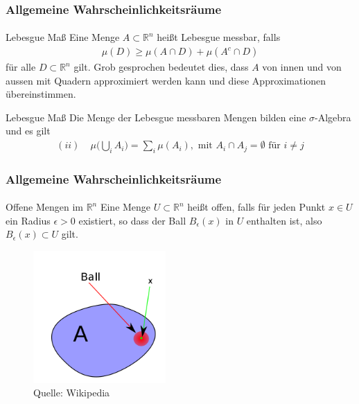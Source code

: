\documentclass{beamer}
\begin{document}
\begin{frame}
    \frametitle{Allgemeine Wahrscheinlichkeitsräume}
\framesubtitle{}

\begin{block}{Lebesgue Maß}
Eine Menge $A \subset \mathbb{R}^n$ heißt Lebesgue messbar, falls
\begin{align*}
\mu(D) \geq \mu(A \cap D) + \mu(A^c \cap D)
\end{align*}
für alle $D \subset  \mathbb{R}^n$ gilt. Grob gesprochen bedeutet dies, dass $A$ von innen und von aussen mit Quadern approximiert werden kann und diese Approximationen übereinstimmen.
\end{block}


\begin{block}{Lebesgue Maß}
Die Menge der  Lebesgue messbaren Mengen bilden eine $\sigma$-Algebra und es gilt 
\begin{align*}
(ii) & \;  \mu \biggl(  \bigcup_i A_i  \biggr) = \sum_i \mu(A_i), \text{ mit } A_i \cap A_j = \emptyset \text{ für } i \neq j
\end{align*}
\end{block}


 \end{frame}




\begin{frame}
    \frametitle{Allgemeine Wahrscheinlichkeitsräume}
\framesubtitle{}

\begin{block}{Offene Mengen im  $\mathbb{R}^n$}
Eine Menge $U \subset  \mathbb{R}^n$ heißt offen, falls für jeden Punkt $x \in U$ ein Radius $\epsilon > 0$ existiert, so dass der Ball $B_\epsilon (x)$ in $U$ enthalten ist, also 
$B_\epsilon (x) \subset U$ gilt.

\end{block}

\begin{figure}[htp]
      \centering
    \includegraphics[width=0.45\textwidth]{img/openset}
      \caption{Quelle: Wikipedia}
\end{figure}

 \end{frame}
\end{document}
